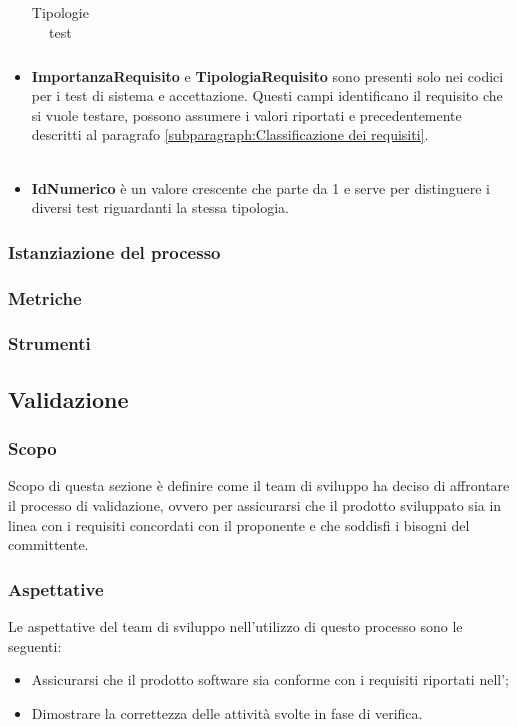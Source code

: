 \begin{itemize}[label={}]
\begin{table}[H]
\begin{tabular}{c|c|p{12cm}}
              \end{tabular}
              \caption{Tipologie test}
          \end{table}
    \item \textbf{ImportanzaRequisito} e \textbf{TipologiaRequisito} sono presenti solo nei codici per i test di sistema e accettazione. Questi campi identificano il requisito che si vuole testare, possono assumere i valori riportati e precedentemente descritti al paragrafo \ref{subparagraph:Classificazione dei requisiti}.\\\\
    \item \textbf{IdNumerico} è un valore crescente che parte da 1 e serve per distinguere i diversi test riguardanti la stessa tipologia.
\end{itemize}
\subsubsection{Istanziazione del processo}
\subsubsection{Metriche}
\subsubsection{Strumenti}

\pagebreak

\subsection{Validazione}\label{subsection: validazione}
\subsubsection{Scopo}
Scopo di questa sezione è definire come il team di sviluppo ha deciso di affrontare il processo di validazione, ovvero per assicurarsi che il prodotto sviluppato sia in linea con i requisiti concordati con il proponente e che soddisfi i bisogni del committente.
\subsubsection{Aspettative}
Le aspettative del team di sviluppo nell'utilizzo di questo processo sono le seguenti:
\begin{itemize}
    \item Assicurarsi che il prodotto software sia conforme con i requisiti riportati nell'\docNameAdRLow;
    \item  Dimostrare la correttezza delle attività svolte in fase di verifica.
\end{itemize}
